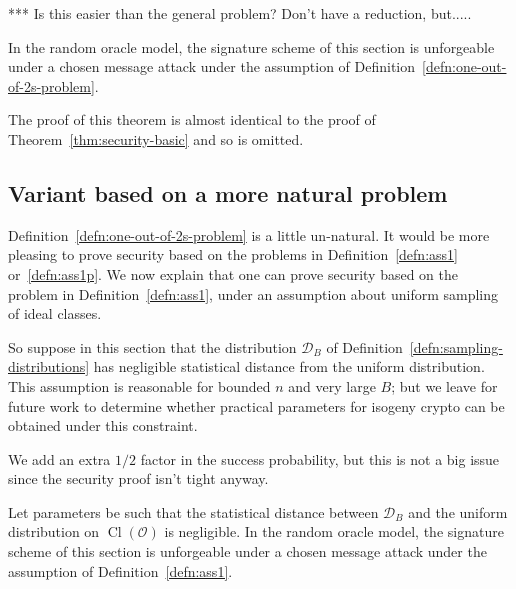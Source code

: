 \documentclass{llncs}
\newcommand{\D}{\mathcal{D}}
\newcommand{\OO}{\mathcal{O}}
\DeclareMathOperator{\Cl}{Cl}
\begin{document}
*** Is this easier than the general problem?  Don't have a reduction, but.....


\begin{theorem}
In the random oracle model, the signature scheme of this section is unforgeable under a chosen message attack under the assumption of Definition~\ref{defn:one-out-of-2s-problem}.
\end{theorem}

The proof of this theorem is almost identical to the proof of Theorem~\ref{thm:security-basic} and so is omitted.



\subsection{Variant based on a more natural problem}


Definition~\ref{defn:one-out-of-2s-problem}  is a little un-natural.
It would be more pleasing to prove security based on the problems in Definition~\ref{defn:ass1} or~\ref{defn:ass1p}.
We now explain that one can prove security based on the problem in Definition~\ref{defn:ass1}, under an assumption about uniform sampling of ideal classes.

So suppose in this section that the distribution $\D_B$ of Definition~\ref{defn:sampling-distributions} has negligible statistical distance from the uniform distribution.
This assumption is reasonable for bounded $n$ and very large $B$; but we leave for future work to determine whether practical parameters for isogeny crypto can be obtained under this constraint.


We add an extra $1/2$ factor in the success probability, but this is not a big issue since the security proof isn't tight anyway.


\begin{theorem}
Let parameters be such that the statistical distance between $\D_B$ and the uniform distribution on $\Cl(\OO)$ is negligible.
In the random oracle model, the signature scheme of this section is unforgeable under a chosen message attack under the assumption of Definition~\ref{defn:ass1}.
\end{theorem}
\end{document}
